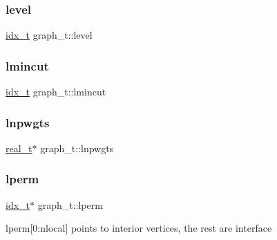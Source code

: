 \mbox{\label{structgraph__t_a8ee3c5b86b691e2c96f78bffec6d46f2}} 
\subsubsection{\texorpdfstring{level}{level}}
{\footnotesize\ttfamily \hyperlink{3rd_party_2parmetis-4_80_83_2metis_2include_2metis_8h_aaa5262be3e700770163401acb0150f52}{idx\+\_\+t} graph\+\_\+t\+::level}

\mbox{\label{structgraph__t_a92aa28928a30f09c684bea12ae2a5a9e}} 
\subsubsection{\texorpdfstring{lmincut}{lmincut}}
{\footnotesize\ttfamily \hyperlink{3rd_party_2parmetis-4_80_83_2metis_2include_2metis_8h_aaa5262be3e700770163401acb0150f52}{idx\+\_\+t} graph\+\_\+t\+::lmincut}

\mbox{\label{structgraph__t_aca56fb74a4334fc2fd480383bec3e387}} 
\subsubsection{\texorpdfstring{lnpwgts}{lnpwgts}}
{\footnotesize\ttfamily \hyperlink{3rd_party_2parmetis-4_80_83_2metis_2include_2metis_8h_a1924a4f6907cc3833213aba1f07fcbe9}{real\+\_\+t}$\ast$ graph\+\_\+t\+::lnpwgts}

\mbox{\label{structgraph__t_aeee46ef4c29b1a5ffe208781e48a3dd8}} 
\subsubsection{\texorpdfstring{lperm}{lperm}}
{\footnotesize\ttfamily \hyperlink{3rd_party_2parmetis-4_80_83_2metis_2include_2metis_8h_aaa5262be3e700770163401acb0150f52}{idx\+\_\+t}$\ast$ graph\+\_\+t\+::lperm}

lperm\mbox{[}0\+:nlocal\mbox{]} points to interior vertices, the rest are interface \mbox{\label{structgraph__t_a6e7e31d965f5b9529bc38967c330dc51}} 
